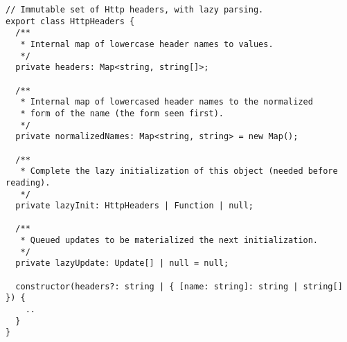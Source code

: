 \begin{verbatim}
// Immutable set of Http headers, with lazy parsing.
export class HttpHeaders {
  /**
   * Internal map of lowercase header names to values.
   */
  private headers: Map<string, string[]>;

  /**
   * Internal map of lowercased header names to the normalized
   * form of the name (the form seen first).
   */
  private normalizedNames: Map<string, string> = new Map();

  /**
   * Complete the lazy initialization of this object (needed before reading).
   */
  private lazyInit: HttpHeaders | Function | null;

  /**
   * Queued updates to be materialized the next initialization.
   */
  private lazyUpdate: Update[] | null = null;

  constructor(headers?: string | { [name: string]: string | string[] }) {
    ..
  }
}
\end{verbatim}
